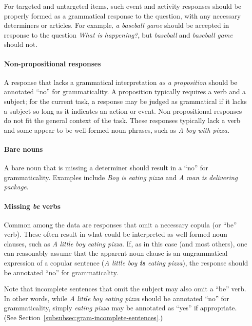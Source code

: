 \documentclass[12pt,notitlepage]{article}
\begin{document}
For targeted and untargeted items, such event and activity responses should be properly formed as a grammatical response to the question, with any necessary determiners or articles. For example, \textit{a baseball game} should be accepted in response to the question \textit{What is happening?}, but \textit{baseball} and \textit{baseball game} should not.

\paragraph{Non-propositional responses} \label{para:non-propositional} A response that lacks a grammatical interpretation \textit{as a proposition} should be annotated ``no'' for grammaticality. A proposition typically requires a verb and a subject; for the current task, a response may be judged as grammatical if it lacks a subject so long as it indicates an action or event. Non-propositional responses do not fit the general context of the task. These responses typically lack a verb and some appear to be well-formed noun phrases, such as \textit{A boy with pizza}.

\paragraph{Bare nouns} A bare noun that is missing a determiner should result in a ``no'' for grammaticality. Examples include \textit{Boy is eating pizza} and \textit{A man is delivering package}.

\paragraph{Missing \textit{be} verbs} Common among the data are responses that omit a necessary copula (or ``be'' verb). These often result in what could be interpreted as well-formed noun clauses, such as \textit{A little boy eating pizza}. If, as in this case (and most others), one can reasonably assume that the apparent noun clause is an ungrammatical expression of a copular sentence (\textit{A little boy \textbf{is} eating pizza}), the response should be annotated ``no'' for grammaticality. 

Note that incomplete sentences that omit the subject may also omit a ``be'' verb. In other words, while \textit{A little boy eating pizza} should be annotated ``no'' for grammaticality, simply \textit{eating pizza} may be annotated as ``yes'' if appropriate. (See Section~\ref{subsubsec:gram-incomplete-sentences}.)
\end{document}
